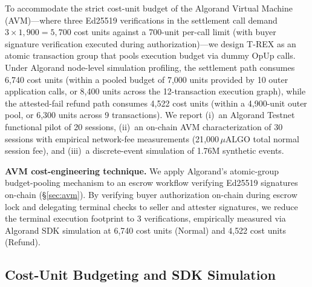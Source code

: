 
To accommodate the strict cost-unit budget of the Algorand Virtual Machine (AVM)---where three Ed25519 verifications in the settlement call demand $3 \times 1{,}900 = 5{,}700$ cost units against a 700-unit per-call limit (with buyer signature verification executed during authorization)---we design T-REX as an atomic transaction group that pools execution budget via dummy OpUp calls. Under Algorand node-level simulation profiling, the settlement path consumes 6{,}740 cost units (within a pooled budget of 7{,}000 units provided by 10 outer application calls, or 8{,}400 units across the 12-transaction execution graph), while the attested-fail refund path consumes 4{,}522 cost units (within a 4{,}900-unit outer pool, or 6{,}300 units across 9 transactions). We report (i)~an Algorand Testnet functional pilot of 20 sessions, (ii)~an on-chain AVM characterization of 30 sessions with empirical network-fee measurements (21{,}000\,$\mu$ALGO total normal session fee), and (iii)~a discrete-event simulation of 1.76M synthetic events.

\item \textbf{AVM cost-engineering technique.} We apply Algorand's atomic-group budget-pooling mechanism to an escrow workflow verifying Ed25519 signatures on-chain (\S\ref{sec:avm}). By verifying buyer authorization on-chain during escrow lock and delegating terminal checks to seller and attester signatures, we reduce the terminal execution footprint to 3 verifications, empirically measured via Algorand SDK simulation at 6{,}740 cost units (Normal) and 4{,}522 cost units (Refund).

\subsection{Cost-Unit Budgeting and SDK Simulation}
\label{sec:avm-budget}

